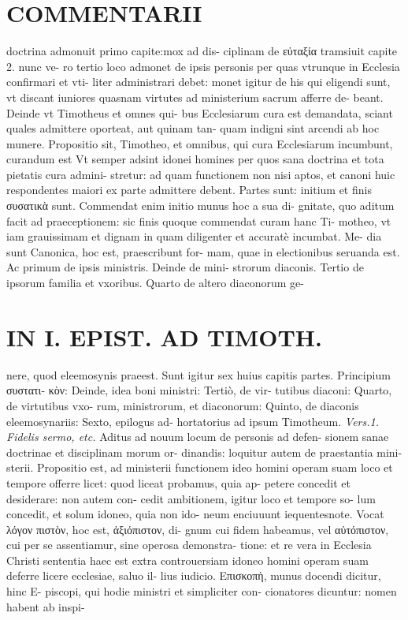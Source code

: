 \documentclass{article}
\begin{document}
\begin{pages}
\section*{COMMENTARII }\pstart doctrina admonuit primo capite:mox ad dis- ciplinam de εὐταξία tramsiuit capite 2. nunc ve- ro tertio loco admonet de ipsis personis per quas vtrunque in Ecclesia confirmari et vti- liter administrari debet: monet igitur de his qui eligendi sunt, vt discant iuniores quasnam virtutes ad ministerium sacrum afferre de- beant. Deinde vt Timotheus et omnes qui- bus Ecclesiarum cura est demandata, sciant quales admittere oporteat, aut quinam tan- quam indigni sint arcendi ab hoc munere.  \pend\pstart Propositio sit, Timotheo, et omnibus, qui cura Ecclesiarum incumbunt, curandum est Vt semper adsint idonei homines per quos sana doctrina et tota pietatis cura admini- stretur: ad quam functionem non nisi aptos, et canoni huic respondentes maiori ex parte admittere debent.  \pend\pstart Partes sunt: initium et finis συσατικὰ sunt. Commendat enim initio munus hoc a sua di- gnitate, quo aditum facit ad praeceptionem: sic finis quoque commendat curam hanc Ti- motheo, vt iam grauissimam et dignam in quam diligenter et accuratè incumbat. Me- dia sunt Canonica, hoc est, praescribunt for- mam, quae in electionibus seruanda est. Ac primum de ipsis ministris. Deinde de mini- strorum diaconis. Tertio de ipsorum familia et vxoribus. Quarto de altero diaconorum ge-  \pend
\section*{IN I. EPIST. AD TIMOTH. }
\marginpar{[ p.61 ]}\pstart nere, quod eleemosynis praeest. Sunt igitur sex huius capitis partes. Principium συστατι- κὸν: Deinde, idea boni ministri: Tertiò, de vir- tutibus diaconi: Quarto, de virtutibus vxo- rum, ministrorum, et diaconorum: Quinto, de diaconis eleemosynariis: Sexto, epilogus ad- hortatorius ad ipsum Timotheum.  \pend
\textit{Vers.1. Fidelis sermo, etc. }\pstart Aditus ad nouum locum de personis ad defen- sionem sanae doctrinae et disciplinam morum or- dinandis: loquitur autem de praestantia mini- sterii. Propositio est, ad ministerii functionem ideo homini operam suam loco et tempore offerre licet: quod liceat probamus, quia ap- petere concedit et desiderare: non autem con- cedit ambitionem, igitur loco et tempore so- lum concedit, et solum idoneo, quia non ido- neum enciuuunt iequentesnote.  \pend\pstart Vocat λόγον πιστὸν, hoc est, ἀξιόπιστον, di- gnum cui fidem habeamus, vel αὐτόπιστον, cui per se assentiamur, sine operosa demonstra- tione: et re vera in Ecclesia Christi sententia haec est extra controuersiam idoneo homini operam suam deferre licere ecclesiae, saluo il- lius iudicio.  \pend\pstart Επισκοπὴ, munus docendi dicitur, hinc E- piscopi, qui hodie ministri et simpliciter con- cionatores dicuntur: nomen habent ab inspi-  \pend
\marginpar{[ p.62 ]}

\end{pages}
\end{document}
